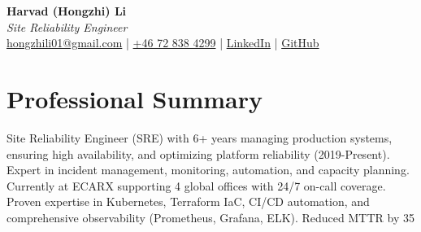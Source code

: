 \documentclass[11pt,a4paper]{article}
\begin{document}
\begin{center}
{\LARGE \textbf{Harvad (Hongzhi) Li}}\\[10pt]
{\Large \textit{Site Reliability Engineer}}\\[10pt]
\textcolor{titlecolor}{\href{mailto:hongzhili01@gmail.com}{hongzhili01@gmail.com} | \href{tel:+46728384299}{+46 72 838 4299} | \href{https://www.linkedin.com/in/harvad/}{LinkedIn} | \href{https://github.com/bluehawana}{GitHub}}
\end{center}

\vspace{8pt}

\section*{Professional Summary}
Site Reliability Engineer (SRE) with 6+ years managing production systems, ensuring high availability, and optimizing platform reliability (2019-Present). Expert in incident management, monitoring, automation, and capacity planning. Currently at ECARX supporting 4 global offices with 24/7 on-call coverage. Proven expertise in Kubernetes, Terraform IaC, CI/CD automation, and comprehensive observability (Prometheus, Grafana, ELK). Reduced MTTR by 35%
\end{document}
